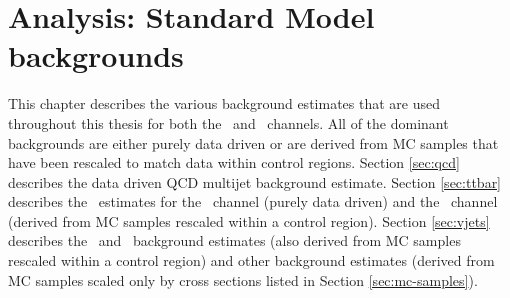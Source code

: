 \chapter{Analysis: Standard Model backgrounds}
\label{ch:analysis-backgrounds}

This chapter describes the various background estimates 
that are used throughout this thesis for both the \eejj~and \enujj~channels.
All of the dominant backgrounds are either purely data driven
or are derived from MC samples that have been rescaled to match
data within control regions.
Section \ref{sec:qcd} describes the data driven QCD multijet background estimate.
Section \ref{sec:ttbar} describes the \ttbar~estimates for the \eejj~channel (purely data driven)
and the \enujj~channel (derived from MC samples rescaled within a control region).
Section \ref{sec:vjets} describes the \zjets~and \wjets~background estimates 
(also derived from MC samples rescaled within a control region) and other background 
estimates (derived from MC samples scaled only by cross sections listed in Section \ref{sec:mc-samples}).

